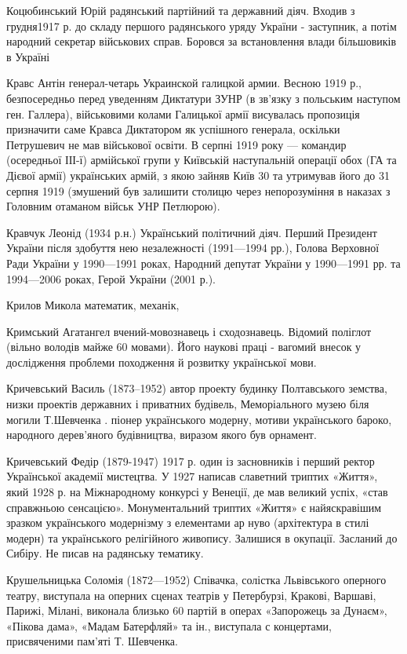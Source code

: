 Коцюбинський Юрій радянський партійний та державний діяч. Входив з грудня1917 р. до складу першого радянського уряду України - заступник, а потім народний секретар військових справ. Боровся за встановлення влади більшовиків в Україні 

Кравс Антін генерал-четарь Украинской галицкой армии. Весною 1919 р., безпосередньо перед уведенням Диктатури ЗУНР (в зв'язку з польським наступом ген. Галлера), військовими колами Галицької армії висувалась пропозиція призначити саме Кравса Диктатором як успішного генерала, оскільки Петрушевич не мав військової освіти. В серпні 1919 року — командир (осередньої ІІІ-ї) армійської групи у Київській наступальній операції обох (ГА та Дієвої армії) українських армій, з якою зайняв Київ 30 та утримував його до 31 серпня 1919 (змушений був залишити столицю через непорозуміння в наказах з Головним отаманом військ УНР Петлюрою).

Кравчук Леонід (1934 р.н.) Український політичний діяч. Перший Президент України після здобуття нею незалежності (1991—1994 рр.), Голова Верховної Ради України у 1990—1991 роках, Народний депутат України у 1990—1991 рр. та 1994—2006 роках, Герой України (2001 р.).

Крилов Микола математик, механік, 

Кримський Агатангел вчений-мовознавець і сходознавець. Відомий поліглот (вільно володів майже 60 мовами). Його наукові праці - вагомий внесок у дослідження проблеми поход­ження й розвитку української мови.

Кричевський Василь (1873–1952) автор проекту будинку Полтавського земства, низки проектів державних і приватних будівель, Меморіального музею біля могили Т.Шевченка . піонер українського модерну, мотиви українського бароко, народного дерев’яного будівництва, виразом якого був орнамент. 

Кричевський Федір  (1879-1947) 1917 р. один із засновників і перший ректор Української академії мистецтва. У 1927 написав славетний триптих «Життя», який  1928 р. на Міжнародному конкурсі у Венеції, де мав великий успіх, «став справжньою сенсацією». Монументальний триптих «Життя» є найяскравішим зразком українського модернізму з елементами ар нуво (архітектура в стилі модерн) та українського релігійного живопису. Залишися в окупації.  Засланий до Сибіру. Не писав на радянську тематику.

Крушельницька Соломія (1872—1952) Співачка, солістка Львівського оперного театру, виступала на оперних сценах театрів у Петербурзі, Кракові, Варшаві, Парижі, Мілані, виконала близько 60 партій в операх «Запорожець за Дунаєм», «Пікова дама», «Мадам Батерфляй» та ін., виступала с концертами, присвяченими пам’яті Т. Шевченка. 

